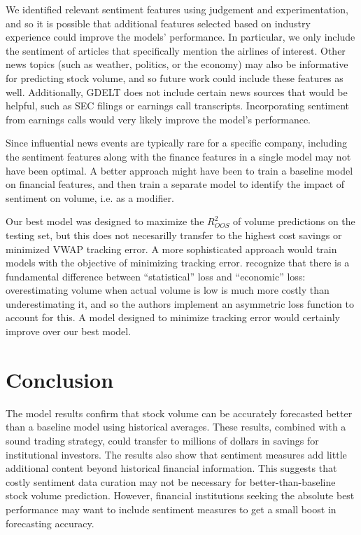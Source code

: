 \documentclass[12pt]{article}
\begin{document}
We identified relevant sentiment features using judgement and experimentation, and so it is possible that additional features selected based on industry experience could improve the models' performance. In particular, we only include the sentiment of articles that specifically mention the airlines of interest. Other news topics (such as weather, politics, or the economy) may also be informative for predicting stock volume, and so future work could include these features as well. Additionally, GDELT does not include certain news sources that would be helpful, such as SEC filings or earnings call transcripts. Incorporating sentiment from earnings calls would very likely improve the model's performance.

Since influential news events are typically rare for a specific company, including the sentiment features along with the finance features in a single model may not have been optimal. A better approach might have been to train a baseline model on financial features, and then train a separate model to identify the impact of sentiment on volume, i.e. as a modifier.

Our best model was designed to maximize the $R^2_{OOS}$ of volume predictions on the testing set, but this does not necesarilly transfer to the highest cost savings or minimized VWAP tracking error. A more sophisticated approach would train models with the objective of minimizing tracking error. \textcite{goyenko2024trading} recognize that there is a fundamental difference between ``statistical'' loss and ``economic'' loss: overestimating volume when actual volume is low is much more costly than underestimating it, and so the authors implement an asymmetric loss function to account for this. A model designed to minimize tracking error would certainly improve over our best model.

\section{Conclusion}
\label{section:conclusion}
The model results confirm that stock volume can be accurately forecasted better than a baseline model using historical averages. These results, combined with a sound trading strategy, could transfer to millions of dollars in savings for institutional investors. The results also show that sentiment measures add little additional content beyond historical financial information. This suggests that costly sentiment data curation may not be necessary for better-than-baseline stock volume prediction. However, financial institutions seeking the absolute best performance may want to include sentiment measures to get a small boost in forecasting accuracy.
\end{document}
